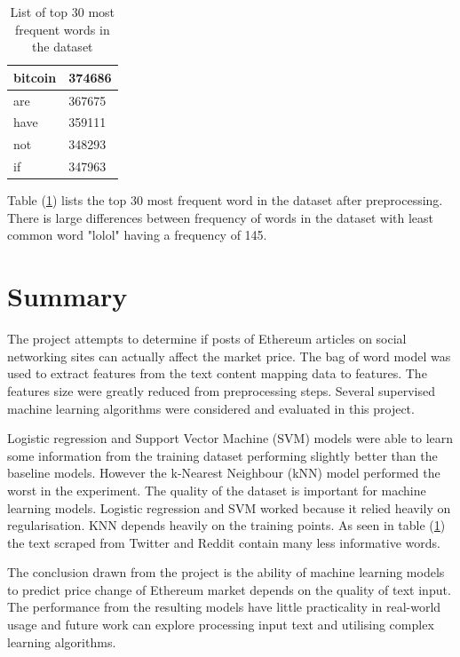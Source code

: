\documentclass[transmag]{IEEEtran}
\begin{document}
\begin{table}[h]
\begin{center}
\begin{tabular}{|l|l|}
bitcoin                             & 374686                                  \\ \hline
are                                 & 367675                                  \\ \hline
have                                & 359111                                  \\ \hline
not                                 & 348293                                  \\ \hline
if                                  & 347963                                  \\ \hline
\end{tabular}
\end{center}
\caption{List of top 30 most frequent words in the dataset}
    \label{tab:top30words}
\end{table}

\noindent Table (\ref{tab:top30words}) lists the top 30 most frequent word in the dataset after preprocessing. There is large differences between frequency of words in the dataset with least common word "lolol" having a frequency of 145.




\section{Summary}

\noindent The project attempts to determine if posts of Ethereum articles on social networking sites can actually affect the market price. The bag of word model was used to extract features from the text content mapping data to features. The features size were greatly reduced from preprocessing steps. Several supervised machine learning algorithms were considered and evaluated in this project.

\noindent Logistic regression and Support Vector Machine (SVM) models were able to learn some information from the training dataset performing slightly better than the baseline models. However the k-Nearest Neighbour (kNN) model performed the worst in the experiment. The quality of the dataset is important for machine learning models. Logistic regression and SVM worked because it relied heavily on regularisation. KNN depends heavily on the training points. As seen in table (\ref{tab:top30words}) the text scraped from Twitter and Reddit contain many less informative words.

\noindent The conclusion drawn from the project is the ability of machine learning models to predict price change of Ethereum market depends on the quality of text input. The performance from the resulting models have little practicality in real-world usage and future work can explore processing input text and utilising complex learning algorithms.







\end{document}
